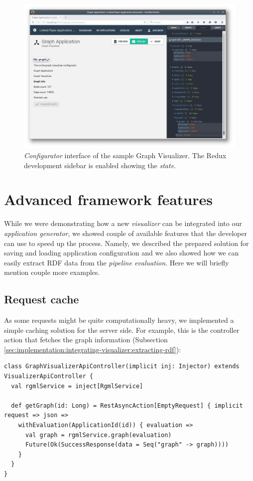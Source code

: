 \begin{figure}
	\centering
	\includegraphics[width=145mm]{img/05_graph_visualizer}
	\caption{\emph{Configurator} interface of the sample Graph Visualizer. The Redux development sidebar is enabled showing the \emph{state}.}
    \label{fig:graph-visualizer}
\end{figure}

\section{Advanced framework features}

While we were demonstrating how a new \emph{visualizer} can be integrated into our \emph{application generator}, we showed couple of available features that the developer can use to speed up the process. Namely, we described the prepared solution for saving and loading application configuration and we also showed how we can easily extract RDF data from the \emph{pipeline evaluation}. Here we will briefly mention couple more examples.

\subsection{Request cache}

As some requests might be quite computationally heavy, we implemented a simple caching solution for the server side. For example, this is the controller action that fetches the graph information (Subsection \ref{sec:implementation:integrating-visualizer:extracting-rdf}):

\begin{verbatim}
class GraphVisualizerApiController(implicit inj: Injector) extends VisualizerApiController {
  val rgmlService = inject[RgmlService]

  def getGraph(id: Long) = RestAsyncAction[EmptyRequest] { implicit request => json =>
    withEvaluation(ApplicationId(id)) { evaluation =>
      val graph = rgmlService.graph(evaluation)
      Future(Ok(SuccessResponse(data = Seq("graph" -> graph))))
    }
  }
}
\end{verbatim}

